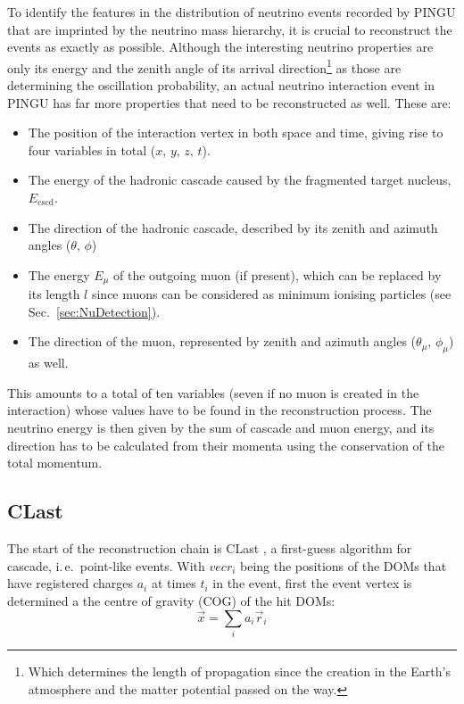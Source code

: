 To identify the features in the distribution of neutrino events recorded by
PINGU that are imprinted by the neutrino mass hierarchy, it is crucial to
reconstruct the events as exactly as possible. Although the interesting neutrino
properties are only its energy and the zenith angle of its arrival
direction\footnote{Which determines the length of propagation since the
creation in the Earth's atmosphere and the matter potential passed on the way.}
as those are determining the oscillation probability, an actual neutrino
interaction event in PINGU has far more properties that need to be
reconstructed as well. These are:
\begin{itemize}
 \item The position of the interaction vertex in both space and time, giving
  rise to four variables in total ($x,\,y,\,z,\,t$).
 \item The energy of the hadronic cascade caused by the fragmented target
  nucleus, $E_\mathrm{cscd}$.
 \item The direction of the hadronic cascade, described by its zenith and
  azimuth angles ($\theta,\,\phi$)
 \item The energy $E_\mu$ of the outgoing muon (if present), which can be
  replaced by its length $l$ since muons can be
  considered as minimum ionising particles (see Sec.~\ref{sec:NuDetection}).
 \item The direction of the muon, represented by zenith and azimuth angles
  ($\theta_\mu,\,\phi_\mu$) as well.
\end{itemize}
This amounts to a total of ten variables (seven if no muon is created in the
interaction) whose values have to be found in the reconstruction process. The
neutrino energy is then given by the sum of cascade and muon energy, and its
direction has to be calculated from their momenta using the conservation of the
total momentum. 

\subsection{CLast}
\label{sec:reco_clast}

The start of the reconstruction chain is CLast \cite{CLast}, a first-guess
algorithm for cascade, i.\,e.\ point-like events. With $vec{r}_i$ being the
positions of the DOMs that have registered charges $a_i$ at times $t_i$ in the
event, first the event vertex is determined a the centre of gravity (COG) of the
hit DOMs:
\begin{equation}
 \vec{x} = \sum_i a_i \vec{r}_i
\end{equation}

